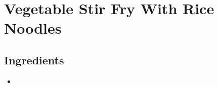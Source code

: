 \thispagestyle{fancy}
\section{Vegetable Stir Fry With Rice Noodles}
\AddToShipoutPicture*{\StirFryRiceNoodles}

\subsection*{Ingredients}
\begin{multicols}{3}
	\begin{itemize}
		\item 
	\end{itemize}
\end{multicols}